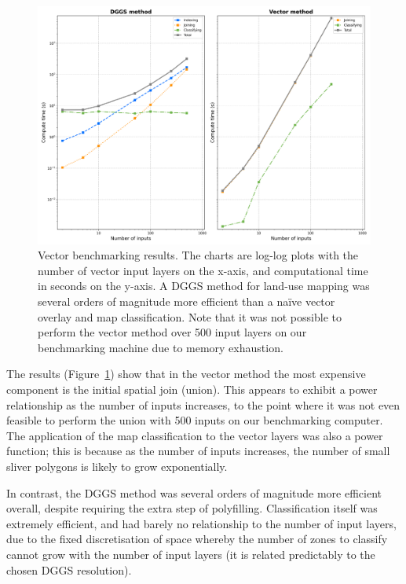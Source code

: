 \documentclass[]{interact}
\theoremstyle{plain}%
\theoremstyle{definition}
\theoremstyle{remark}
\begin{document}
\begin{figure}[t]
    \centering
    \includegraphics[width=0.85\linewidth]{images/vector-results.png}
    \caption{Vector benchmarking results. The charts are log-log plots with the number of vector input layers on the x-axis, and computational time in seconds on the y-axis. A \ac{DGGS} method for land-use mapping was several orders of magnitude more efficient than a na\"{i}ve vector overlay and map classification. Note that it was not possible to perform the vector method over 500 input layers on our benchmarking machine due to memory exhaustion.}
    \label{fig:BenchmarkVect}
\end{figure}

The results (Figure~\ref{fig:BenchmarkVect}) show that in the vector method the most expensive component is the initial spatial join (union). This appears to exhibit a power relationship as the number of inputs increases, to the point where it was not even feasible to perform the union with 500 inputs on our benchmarking computer. The application of the map classification to the vector layers was also a power function; this is because as the number of inputs increases, the number of small sliver polygons is likely to grow exponentially.

In contrast, the \ac{DGGS} method was several orders of magnitude more efficient overall, despite requiring the extra step of polyfilling. Classification itself was extremely efficient, and had barely no relationship to the number of input layers, due to the fixed discretisation of space whereby the number of zones to classify cannot grow with the number of input layers (it is related predictably to the chosen \ac{DGGS} resolution).
\end{document}
